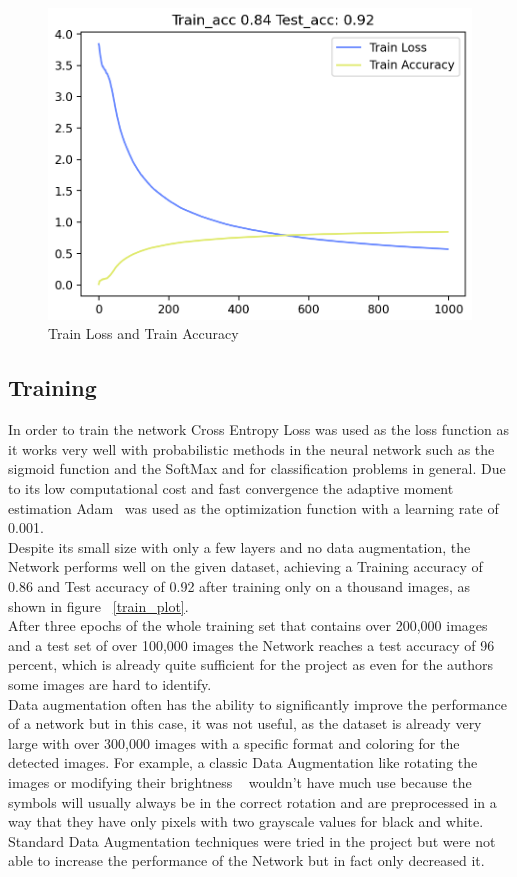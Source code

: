 \documentclass[@CLASSOPTIONS@]{tumarticle}
\begin{document}
\begin{figure}
    \begin{minipage}{0.48\textwidth}
     \centering
     \includegraphics[width=.9\linewidth]{figures/train_plot}
     \caption{Train Loss and Train Accuracy}\label{Fig:train_plot}
   \end{minipage}
\end{figure}

\subsection{Training}

In order to train the network Cross Entropy Loss was used as the loss function as it works very well with probabilistic
methods in the neural network such as the sigmoid function and the SoftMax and for classification problems in general.
Due to its low computational cost and fast convergence the adaptive moment estimation Adam~\cite{Adam} was used as the optimization
function with a learning rate of 0.001.\\
Despite its small size with only a few layers and no data augmentation, the Network performs well on the given dataset,
achieving a Training accuracy of 0.86 and Test accuracy of 0.92 after training only on a thousand images, as shown in
figure ~\ref{train_plot}.\\
After three epochs of the whole training set that contains over 200,000 images and a test set of over 100,000 images the
Network reaches a test accuracy of 96 percent, which is already quite sufficient for the project as even for the authors
some images are hard to identify.\\
Data augmentation often has the ability to significantly improve the performance of a network but in this case, it
was not useful, as the dataset is already very large with over 300,000 images with a specific format and coloring for
the detected images.
For example, a classic Data Augmentation like rotating the images or modifying their brightness ~\cite{DataAugm}
wouldn’t have much use because the symbols will usually always be in the correct rotation and are preprocessed in a
way that they have only pixels with two grayscale values for black and white.
Standard Data Augmentation techniques were tried in the project but were not able to increase the performance of the
Network but in fact only decreased it.
\end{document}
